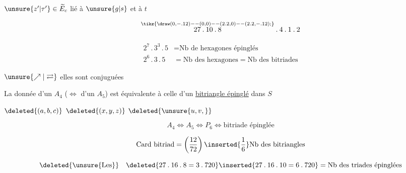 

$\unsure{z'|\tau'}\in\widetilde E_{c}$ lié à $\unsure{g|s}$ et à $t$

\[
\overset{\tikz{\draw (0,-.12)--(0,0)--(2.2,0)--(2.2,-.12);}}{27\mathbin{.}10\mathbin{.}8}\mathbin{.}4\mathbin{.}1\mathbin{.}2
\]

\[
\begin{aligned}
2^7\mathbin{.}3^3\mathbin{.}5&=\text{Nb de hexagones épinglés}\\
2^6\mathbin{.}3\mathbin{.}5&=\text{Nb des hexagones}=\text{Nb des bitriades}
\end{aligned}
\]

$\unsure{\nearrow|\rightleftarrows}$ elles sont conjuguées 

La donnée d'un $A_4$ ($\Longleftrightarrow$ d'un $A_5$) est équivalente à celle d'un \uline{bitriangle épinglé} dans $S$

$\deleted{(a,b,c)}$ $\deleted{(x,y,z)}$ $\deleted{\unsure{u,v,}}$

\[
 A_4\Longleftrightarrow A_5\Longleftrightarrow P_6\Longleftrightarrow \text{bitriade épinglée}
\]

 

  
\[
\text{Card bitriad}=\left(\frac{12}{72}\right)\inserted{\frac16}\text{Nb des bitriangles}
\]

\[
\deleted{\unsure{\mathrm{Les}}}\quad\deleted{27\mathbin{.}16\mathbin{.}8=3\mathbin{.}720}
\inserted{27\mathbin{.}16\mathbin{.}10=6\mathbin{.}720}=\text{Nb des triades épinglées}
\]


